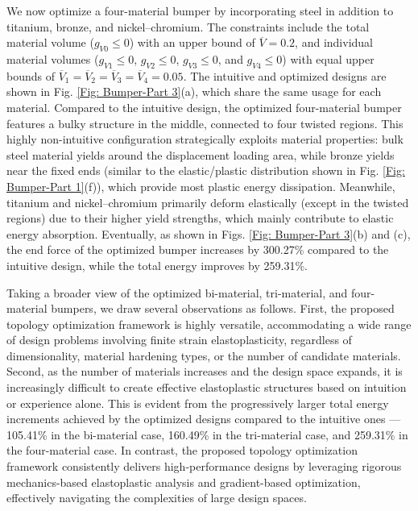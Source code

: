 \documentclass[preprint,11pt]{elsarticle}
\theoremstyle{definition}
\begin{document}
We now optimize a four-material bumper by incorporating steel in addition to titanium, bronze, and nickel--chromium. The constraints include the total material volume ($g_{V0} \leq 0$) with an upper bound of $\overline{V} = 0.2$, and individual material volumes ($g_{V1} \leq 0$, $g_{V2} \leq 0$, $g_{V3} \leq 0$, and $g_{V4} \leq 0$) with equal upper bounds of $\overline{V}_1 = \overline{V}_2 = \overline{V}_3 = \overline{V}_4 = 0.05$. The intuitive and optimized designs are shown in Fig. \ref{Fig: Bumper-Part 3}(a), which share the same usage for each material. Compared to the intuitive design, the optimized four-material bumper features a bulky structure in the middle, connected to four twisted regions. This highly non-intuitive configuration strategically exploits material properties: bulk steel material yields around the displacement loading area, while bronze yields near the fixed ends (similar to the elastic/plastic distribution shown in Fig. \ref{Fig: Bumper-Part 1}(f)), which provide most plastic energy dissipation. Meanwhile, titanium and nickel--chromium primarily deform elastically (except in the twisted regions) due to their higher yield strengths, which mainly contribute to elastic energy absorption. Eventually, as shown in Figs. \ref{Fig: Bumper-Part 3}(b) and (c), the end force of the optimized bumper increases by 300.27\% compared to the intuitive design, while the total energy improves by 259.31\%.

Taking a broader view of the optimized bi-material, tri-material, and four-material bumpers, we draw several observations as follows. First, the proposed topology optimization framework is highly versatile, accommodating a wide range of design problems involving finite strain elastoplasticity, regardless of dimensionality, material hardening types, or the number of candidate materials. Second, as the number of materials increases and the design space expands, it is increasingly difficult to create effective elastoplastic structures based on intuition or experience alone. This is evident from the progressively larger total energy increments achieved by the optimized designs compared to the intuitive ones --- 105.41\% in the bi-material case, 160.49\% in the tri-material case, and 259.31\% in the four-material case. In contrast, the proposed topology optimization framework consistently delivers high-performance designs by leveraging rigorous mechanics-based elastoplastic analysis and gradient-based optimization, effectively navigating the complexities of large design spaces.
\end{document}
